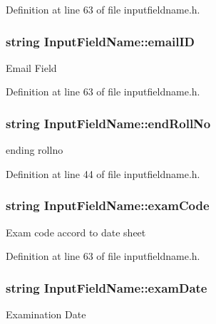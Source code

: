 \-Definition at line 63 of file inputfieldname.\-h.

\hypertarget{classInputFieldName_a05541618feaaebe7a3f74b0bf8fa74b9}{
\subsubsection[{email\-I\-D}]{\setlength{\rightskip}{0pt plus 5cm}string {\bf \-Input\-Field\-Name\-::email\-I\-D}}}\label{classInputFieldName_a05541618feaaebe7a3f74b0bf8fa74b9}
\-Email \-Field 

\-Definition at line 63 of file inputfieldname.\-h.

\hypertarget{classInputFieldName_a06435f9ba5a529cbba4ee1ce9b02e5cc}{
\subsubsection[{end\-Roll\-No}]{\setlength{\rightskip}{0pt plus 5cm}string {\bf \-Input\-Field\-Name\-::end\-Roll\-No}}}\label{classInputFieldName_a06435f9ba5a529cbba4ee1ce9b02e5cc}
ending rollno 

\-Definition at line 44 of file inputfieldname.\-h.

\hypertarget{classInputFieldName_a3cc09a852d20e96bb4908b9f66c01ed7}{
\subsubsection[{exam\-Code}]{\setlength{\rightskip}{0pt plus 5cm}string {\bf \-Input\-Field\-Name\-::exam\-Code}}}\label{classInputFieldName_a3cc09a852d20e96bb4908b9f66c01ed7}
\-Exam code accord to date sheet 

\-Definition at line 63 of file inputfieldname.\-h.

\hypertarget{classInputFieldName_a4e60d793497c36b2d80e2411cbb915d8}{
\subsubsection[{exam\-Date}]{\setlength{\rightskip}{0pt plus 5cm}string {\bf \-Input\-Field\-Name\-::exam\-Date}}}\label{classInputFieldName_a4e60d793497c36b2d80e2411cbb915d8}
\-Examination \-Date 

